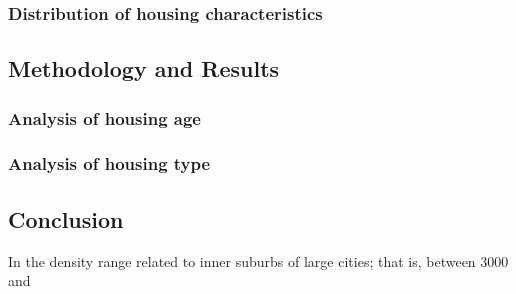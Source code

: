 \documentclass{article}
\begin{document}
\subsubsection*{Distribution of housing characteristics}

\subsection*{Methodology and Results}

\subsubsection*{Analysis of housing age}

\subsubsection*{Analysis of housing type}

\subsection*{Conclusion}

In the density range related to inner suburbs of large cities; that is, between 3000 and 
\end{document}

